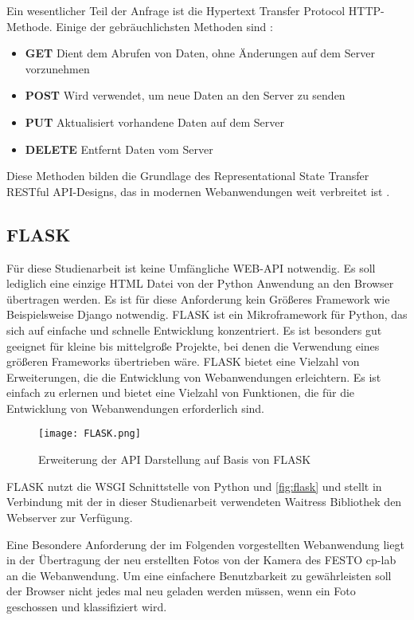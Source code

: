 Ein wesentlicher Teil der Anfrage ist die Hypertext Transfer Protocol \ac{HTTP}-Methode. Einige der gebräuchlichsten Methoden sind \cite{rodriguez_rest_2016}:
\begin{itemize}
    \item \textbf{GET} Dient dem Abrufen von Daten, ohne Änderungen auf dem Server vorzunehmen
    \item \textbf{POST} Wird verwendet, um neue Daten an den Server zu senden
    \item \textbf{PUT} Aktualisiert vorhandene Daten auf dem Server
    \item \textbf{DELETE} Entfernt Daten vom Server
\end{itemize}

Diese Methoden bilden die Grundlage des Representational State Transfer \ac{REST}ful API-Designs, das in modernen Webanwendungen weit verbreitet ist \cite{rodriguez_rest_2016}.

\subsection{FLASK} \label{subsec:flask}  %

Für diese Studienarbeit ist keine Umfängliche WEB-\ac{API} notwendig. Es soll lediglich eine einzige \ac{HTML} Datei von der Python Anwendung an den Browser übertragen werden. Es ist für diese Anforderung kein Größeres Framework wie Beispielsweise Django notwendig. FLASK ist ein Mikroframework für Python, das sich auf einfache und schnelle Entwicklung konzentriert. Es ist besonders gut geeignet für kleine bis mittelgroße Projekte, bei denen die Verwendung eines größeren Frameworks übertrieben wäre. FLASK bietet eine Vielzahl von Erweiterungen, die die Entwicklung von Webanwendungen erleichtern. Es ist einfach zu erlernen und bietet eine Vielzahl von Funktionen, die für die Entwicklung von Webanwendungen erforderlich sind.

\begin{figure}[h]
    \centering
    \texttt{[image: FLASK.png]}
    \caption{Erweiterung der API Darstellung auf Basis von FLASK}
    \label{fig:flask}
\end{figure}

FLASK nutzt die \ac{WSGI} Schnittstelle von Python \cite{flask_welcome_nodate} und \autoref{fig:flask} und stellt in Verbindung mit der in dieser Studienarbeit verwendeten Waitress Bibliothek den Webserver zur Verfügung.

Eine Besondere Anforderung der im Folgenden vorgestellten Webanwendung liegt in der Übertragung der neu erstellten Fotos von der Kamera des FESTO \ac{cp-lab} an die 
Webanwendung. Um eine einfachere Benutzbarkeit zu gewährleisten soll der Browser nicht jedes mal neu geladen werden müssen, wenn ein Foto geschossen und klassifiziert wird.

